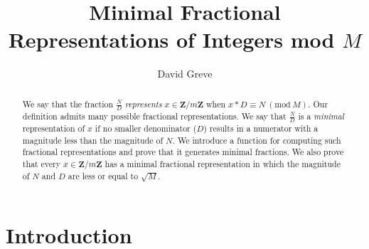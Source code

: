 \documentclass[submission,copyright,creativecommons]{eptcs}
\title{Minimal Fractional Representations of Integers mod $M$ }
\author{David Greve
\email{david@thegreves.com}
}
\newcommand{\Mod}[1]{\ (\mathrm{mod}\ #1)}
\begin{document}
\maketitle

\begin{abstract}

We say that the fraction $\frac{N}{D}$ \emph{represents} $x \in
\mathbf{Z}/m\mathbf{Z}$ when $x*D \equiv N \Mod{M}$.  Our definition
admits many possible fractional representations.  We say that
$\frac{N}{D}$ is a \emph{minimal} representation of $x$ if no smaller
denominator ($D$) results in a numerator with a magnitude less than
the magnitude of $N$.  We introduce a function for computing such fractional
representations and prove that it generates minimal fractions.  We
also prove that every $x \in \mathbf{Z}/m\mathbf{Z}$ has a minimal
fractional representation in which the magnitude of $N$ and $D$
are less or equal to $\sqrt{M}$.

\end{abstract}

\section{Introduction}
\end{document}
